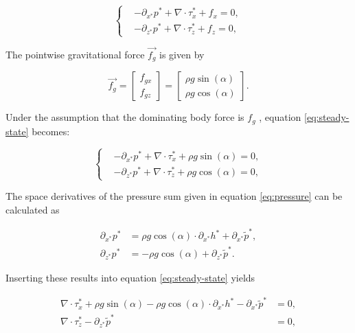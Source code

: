 \begin{equation} \label{eq:steady-state}
  \begin{cases}
    &-\partial_{x^*} p^* + \nabla \cdot \tau_x^* + f_x = 0, \\
    &-\partial_{z^*} p^* + \nabla \cdot \tau_z^* + f_z = 0,
  \end{cases}
\end{equation}

The pointwise gravitational force $\vec{f_g}$ is given by

\begin{equation}
  \vec{f_g} = \begin{bmatrix} f_{gx} \\ f_{gz} \end{bmatrix} = \begin{bmatrix} \rho g \sin(\alpha) \\ \rho g \cos(\alpha) \end{bmatrix}.
\end{equation}

Under the assumption that the dominating body force is $f_g$ , equation \eqref{eq:steady-state} becomes:

\begin{equation} \label{eq:steady-state}
  \begin{cases}
    &-\partial_{x^*} p^* + \nabla \cdot \tau_x^* + \rho g \sin(\alpha) = 0, \\
    &-\partial_{z^*} p^* + \nabla \cdot \tau_z^* + \rho g \cos(\alpha) = 0,
  \end{cases}
\end{equation}

The space derivatives of the pressure sum given in equation \eqref{eq:pressure} can be calculated as

\begin{equation} \label{eq:pressure-space-derivative}
  \begin{align}
  \partial_{x^*} p^* &= \rho g \cos(\alpha) \cdot \partial_{x^*} h^* + \partial_{x^*} \tilde{p}^*, \\
  \partial_{z^*} p^* &= - \rho g \cos(\alpha) + \partial_{z^*} \tilde{p}^*.
  \end{align}
\end{equation}

Inserting these results into equation \eqref{eq:steady-state} yields

\begin{equation} \label{eq:steady-state}
  \begin{align}
    \nabla \cdot \tau_x^* + \rho g \sin(\alpha) - \rho g \cos(\alpha) \cdot \partial_{x^*} h^* - \partial_{x^*} \tilde{p}^* &= 0, \\
    \nabla \cdot \tau_z^* - \partial_{z^*} \tilde{p}^* &= 0,
  \end{align}
\end{equation}
